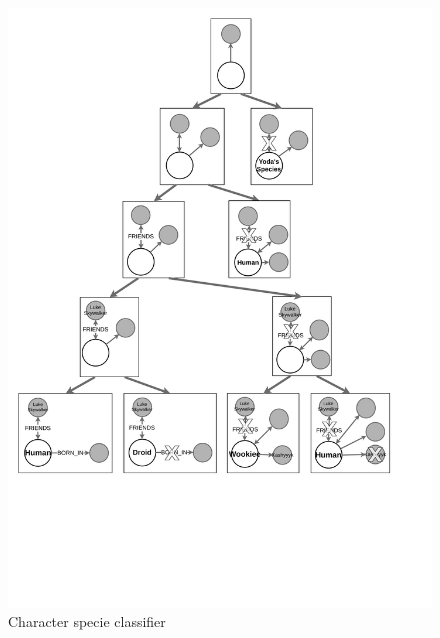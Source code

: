 \documentclass[mathematics,article,submit,pdftex,moreauthors]{Definitions/mdpi}
\begin{document}
\begin{figure}[htb]
    \begin{center}
        \includegraphics[scale=0.3]{png/FIG7.pdf}
    \end{center}
	\caption{Character specie classifier}
	    \label{droid}
\end{figure}

%
\end{document}
